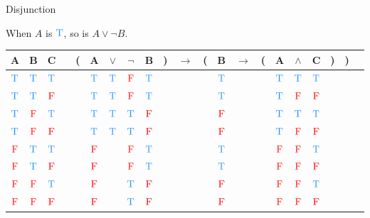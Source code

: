 \documentclass[
  ignorenonframetext,
]{beamer}
\renewcommand{\,}{\text{, }}
\def\True{\textcolor{dodgerblue}{\text{T}}}
\def\False{\textcolor{red}{\text{F}}}
\begin{document}
\begin{frame}{Disjunction}
\protect\hypertarget{disjunction}{}

When \(A\) is \(\True\), so is \(A \vee \neg B\).

\begin{center}
\bigskip
\begin{tabular}{@{ }c@{ }@{ }c@{ }@{ }c | c@{ }@{}c@{}@{ }c@{ }@{ }c@{ }@{ }c@{ }@{ }c@{ }@{}c@{}@{ }c@{ }@{}c@{}@{ }c@{ }@{ }c@{ }@{}c@{}@{ }c@{ }@{ }c@{ }@{ }c@{ }@{}c@{}@{}c@{}@{ }c}
A & B & C &  & ( & A & $\vee$ & $\neg$ & B & ) & $\rightarrow$ & ( & B & $\rightarrow$ & ( & A & $\wedge$ & C & ) & ) & \\
\hline 
 $\True$ & $\True$ & $\True$ &  &  & $\True$ & $\True$ & $\False$ & $\True$ &  &&  & $\True$ &&  & $\True$ & $\True$ & $\True$ &  &  & \\
 $\True$ & $\True$ & $\False$ &  &  & $\True$ & $\True$ & $\False$ & $\True$ &  &&  & $\True$ &&  & $\True$ & $\False$ & $\False$ &  &  & \\
 $\True$ & $\False$ & $\True$ &  &  & $\True$ & $\True$ & $\True$ & $\False$ &  &&  & $\False$ &&  & $\True$ & $\True$ & $\True$ &  &  & \\
 $\True$ & $\False$ & $\False$ &  &  & $\True$ & $\True$ & $\True$ & $\False$ &  &&  & $\False$ &&  & $\True$ & $\False$ & $\False$ &  &  & \\
 $\False$ & $\True$ & $\True$ &  &  & $\False$ && $\False$ & $\True$ &  &&  & $\True$ &&  & $\False$ & $\False$ & $\True$ &  &  & \\
 $\False$ & $\True$ & $\False$ &  &  & $\False$ && $\False$ & $\True$ &  &&  & $\True$ &&  & $\False$ & $\False$ & $\False$ &  &  & \\
 $\False$ & $\False$ & $\True$ &  &  & $\False$ && $\True$ & $\False$ &  &&  & $\False$ &&  & $\False$ & $\False$ & $\True$ &  &  & \\
 $\False$ & $\False$ & $\False$ &  &  & $\False$ && $\True$ & $\False$ &  &&  & $\False$ &&  & $\False$ & $\False$ & $\False$ &  &  & \\
\end{tabular}
\bigskip
\end{center}

\end{frame}
\end{document}
